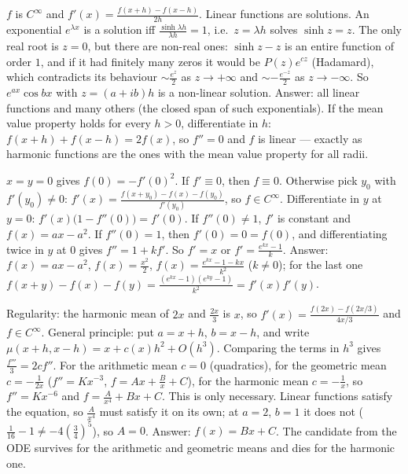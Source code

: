 \documentclass[11pt,a4paper]{article}
\begin{document}
 \(f\) is \(C^\infty\) and \(f'(x)=\frac{f(x+h)-f(x-h)}{2h}\). Linear functions are solutions. An exponential \(e^{\lambda x}\) is a solution iff \(\frac{\sinh\lambda h}{\lambda h}=1\), i.e.\ \(z=\lambda h\) solves \(\sinh z=z\).
 The only real root is \(z=0\), but there are non-real ones: \(\sinh z-z\) is an entire function of order \(1\), and if it had finitely many zeros it would be \(P(z)e^{cz}\) (Hadamard), which contradicts its behaviour \(\sim\frac{e^z}2\) as \(z\to+\infty\) and \(\sim-\frac{e^{-z}}2\) as \(z\to-\infty\). So \(e^{ax}\cos bx\) with \(z=(a+ib)h\) is a non-linear solution.
 Answer: all linear functions and many others (the closed span of such exponentials). If the mean value property holds for every \(h\gt0\), differentiate in \(h\): \(f(x+h)+f(x-h)=2f(x)\), so \(f''=0\) and \(f\) is linear --- exactly as harmonic functions are the ones with the mean value property for all radii.

 \(x=y=0\) gives \(f(0)=-f'(0)^2\). If \(f'\equiv0\), then \(f\equiv0\). Otherwise pick \(y_0\) with \(f'(y_0)\ne0\): \(f'(x)=\frac{f(x+y_0)-f(x)-f(y_0)}{f'(y_0)}\), so \(f\in C^\infty\).
 Differentiate in \(y\) at \(y=0\): \(f'(x)\bigl(1-f''(0)\bigr)=f'(0)\). If \(f''(0)\ne1\), \(f'\) is constant and \(f(x)=ax-a^2\).
 If \(f''(0)=1\), then \(f'(0)=0=f(0)\), and differentiating twice in \(y\) at \(0\) gives \(f''=1+kf'\). So \(f'=x\) or \(f'=\frac{e^{kx}-1}k\). Answer: \(f(x)=ax-a^2\), \(f(x)=\frac{x^2}2\), \(f(x)=\frac{e^{kx}-1-kx}{k^2}\) (\(k\ne0\)); for the last one \(f(x+y)-f(x)-f(y)=\frac{(e^{kx}-1)(e^{ky}-1)}{k^2}=f'(x)f'(y)\).

 Regularity: the harmonic mean of \(2x\) and \(\frac{2x}3\) is \(x\), so \(f'(x)=\frac{f(2x)-f(2x/3)}{4x/3}\) and \(f\in C^\infty\).
 General principle: put \(a=x+h\), \(b=x-h\), and write \(\mu(x+h,x-h)=x+c(x)h^2+O(h^3)\). Comparing the terms in \(h^3\) gives \(\frac{f'''}3=2cf''\). For the arithmetic mean \(c=0\) (quadratics), for the geometric mean \(c=-\frac1{2x}\) (\(f''=Kx^{-3}\), \(f=Ax+\frac Bx+C\)), for the harmonic mean \(c=-\frac1x\), so \(f''=Kx^{-6}\) and \(f=\frac A{x^4}+Bx+C\).
 This is only necessary. Linear functions satisfy the equation, so \(\frac A{x^4}\) must satisfy it on its own; at \(a=2\), \(b=1\) it does not (\(\frac1{16}-1\ne-4(\frac34)^5\)), so \(A=0\). Answer: \(f(x)=Bx+C\). The candidate from the ODE survives for the arithmetic and geometric means and dies for the harmonic one.
\end{document}
